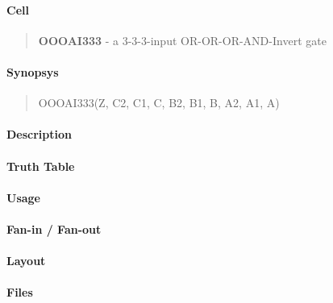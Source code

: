 \label{OOOAI333}
\paragraph{Cell}
\begin{quote}
    \textbf{OOOAI333} - a 3-3-3-input OR-OR-OR-AND-Invert gate
\end{quote}

\paragraph{Synopsys}
\begin{quote}
    OOOAI333(Z, C2, C1, C, B2, B1, B, A2, A1, A)
\end{quote}

\paragraph{Description}



\paragraph{Truth Table}


\paragraph{Usage}

\paragraph{Fan-in / Fan-out}

\paragraph{Layout}

\paragraph{Files}
